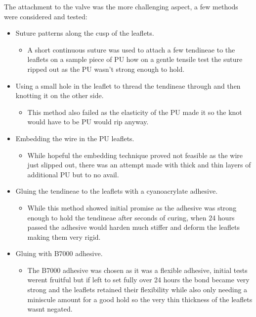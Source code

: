 The attachment to the valve was the more challenging aspect, a few methods were considered and tested:
\begin{itemize}
  \item Suture patterns along the cusp of the leaflets.
        \begin{itemize}
          \item A short continuous suture was used to attach a few tendineae to the leaflets on a sample piece of \gls{PU} how on a gentle tensile test the suture ripped out as the \gls{PU} wasn't strong enough to hold.
        \end{itemize}
  \item Using a small hole in the leaflet to thread the tendineae through and then knotting it on the other side.
        \begin{itemize}
          \item This method also failed as the elasticity of the \gls{PU} made it so the knot would have to be \gls{PU} would rip anyway.
        \end{itemize}
  \item Embedding the wire in the \gls{PU} leaflets.
        \begin{itemize}
          \item While hopeful the embedding technique proved not feasible as the wire just slipped out, there was an attempt made with thick and thin layers of additional \gls{PU} but to no avail.
        \end{itemize}
  \item Gluing the tendineae to the leaflets with a cyanoacrylate adhesive.
        \begin{itemize}
          \item While this method showed initial promise as the adhesive was strong enough to hold the tendineae after seconds of curing, when 24 hours passed the adhesive would harden much stiffer and deform the leaflets making them very rigid.
        \end{itemize}
  \item Gluing with B7000 adhesive.
        \begin{itemize}
          \item The B7000 adhesive was chosen as it was a flexible adhesive, initial tests werent fruitful but if left to set fully over 24 hours the bond became very strong and the leaflets retained their flexibility while also only needing a miniscule amount for a good hold so the very thin thickness of the leaflets wasnt negated.
        \end{itemize}
\end{itemize}
